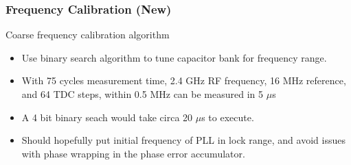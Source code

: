 \documentclass[t, screen, aspectratio=43]{beamer}
\begin{document}
\begin{frame}
	\frametitle{Frequency Calibration (New)}
	\begin{block}{Coarse frequency calibration algorithm}
		\begin{itemize}
			\vspace{-0.25em}
			\scriptsize
			\item Use binary search algorithm to tune capacitor bank for frequency range.
			\item With 75 cycles measurement time, 2.4 GHz RF frequency, 16 MHz reference, and 64 TDC steps, within 0.5 MHz can be measured in 5 $\mu$s
			\item A 4 bit binary seach would take circa 20 $\mu$s to execute. 
			\item Should hopefully put initial frequency of PLL in lock range, and avoid issues with phase wrapping in the phase error accumulator.
		\end{itemize} 	
 
	\end{block}
\end{frame}





\end{document}
